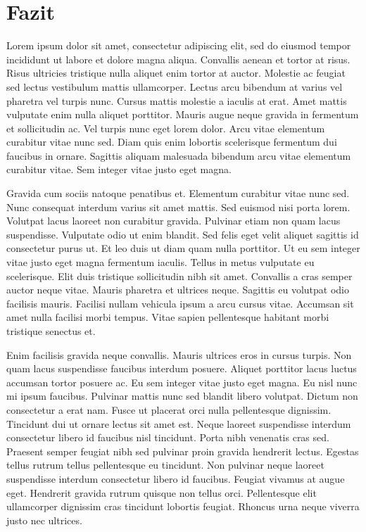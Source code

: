\documentclass[
  11pt,
  a4paper,
  openright,
  cleardoublepage=plain,
  parskip=half+, %
]{scrreprt}
\begin{document}
\hypertarget{fazit}{%
\chapter{Fazit}\label{fazit}}

Lorem ipsum dolor sit amet, consectetur adipiscing elit, sed do eiusmod
tempor incididunt ut labore et dolore magna aliqua. Convallis aenean et
tortor at risus. Risus ultricies tristique nulla aliquet enim tortor at
auctor. Molestie ac feugiat sed lectus vestibulum mattis ullamcorper.
Lectus arcu bibendum at varius vel pharetra vel turpis nunc. Cursus
mattis molestie a iaculis at erat. Amet mattis vulputate enim nulla
aliquet porttitor. Mauris augue neque gravida in fermentum et
sollicitudin ac. Vel turpis nunc eget lorem dolor. Arcu vitae elementum
curabitur vitae nunc sed. Diam quis enim lobortis scelerisque fermentum
dui faucibus in ornare. Sagittis aliquam malesuada bibendum arcu vitae
elementum curabitur vitae. Sem integer vitae justo eget magna.

Gravida cum sociis natoque penatibus et. Elementum curabitur vitae nunc
sed. Nunc consequat interdum varius sit amet mattis. Sed euismod nisi
porta lorem. Volutpat lacus laoreet non curabitur gravida. Pulvinar
etiam non quam lacus suspendisse. Vulputate odio ut enim blandit. Sed
felis eget velit aliquet sagittis id consectetur purus ut. Et leo duis
ut diam quam nulla porttitor. Ut eu sem integer vitae justo eget magna
fermentum iaculis. Tellus in metus vulputate eu scelerisque. Elit duis
tristique sollicitudin nibh sit amet. Convallis a cras semper auctor
neque vitae. Mauris pharetra et ultrices neque. Sagittis eu volutpat
odio facilisis mauris. Facilisi nullam vehicula ipsum a arcu cursus
vitae. Accumsan sit amet nulla facilisi morbi tempus. Vitae sapien
pellentesque habitant morbi tristique senectus et.

Enim facilisis gravida neque convallis. Mauris ultrices eros in cursus
turpis. Non quam lacus suspendisse faucibus interdum posuere. Aliquet
porttitor lacus luctus accumsan tortor posuere ac. Eu sem integer vitae
justo eget magna. Eu nisl nunc mi ipsum faucibus. Pulvinar mattis nunc
sed blandit libero volutpat. Dictum non consectetur a erat nam. Fusce ut
placerat orci nulla pellentesque dignissim. Tincidunt dui ut ornare
lectus sit amet est. Neque laoreet suspendisse interdum consectetur
libero id faucibus nisl tincidunt. Porta nibh venenatis cras sed.
Praesent semper feugiat nibh sed pulvinar proin gravida hendrerit
lectus. Egestas tellus rutrum tellus pellentesque eu tincidunt. Non
pulvinar neque laoreet suspendisse interdum consectetur libero id
faucibus. Feugiat vivamus at augue eget. Hendrerit gravida rutrum
quisque non tellus orci. Pellentesque elit ullamcorper dignissim cras
tincidunt lobortis feugiat. Rhoncus urna neque viverra justo nec
ultrices.
\newpage
\end{document}
